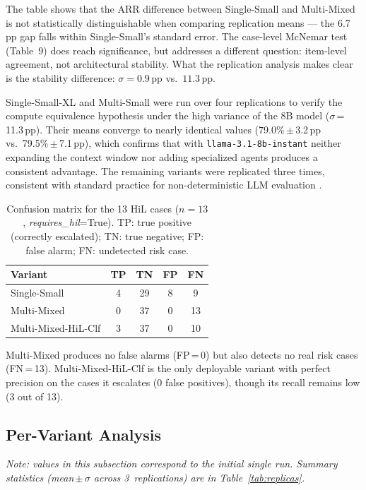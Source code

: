 \documentclass[preprint,12pt,numrefs]{elsarticle}
\begin{document}
The table shows that the ARR difference between Single-Small and
Multi-Mixed is not statistically distinguishable when comparing
replication means --- the 6.7\,pp gap falls within Single-Small's
standard error. The case-level McNemar test (Table~9) does reach
significance, but addresses a different question: item-level agreement,
not architectural stability. What the replication analysis makes clear
is the stability difference: $\sigma = 0.9$\,pp vs.\ $11.3$\,pp.

Single-Small-XL and Multi-Small were run over four replications
to verify the compute equivalence hypothesis under the high variance
of the 8B model ($\sigma$\,=\,11.3\,pp). Their means converge to
nearly identical values (79.0\%\,$\pm$\,3.2\,pp vs.\
79.5\%\,$\pm$\,7.1\,pp), which confirms that with
\texttt{llama-3.1-8b-instant} neither expanding the context window
nor adding specialized agents produces a consistent advantage. The
remaining variants were replicated three times, consistent with
standard practice for non-deterministic LLM evaluation
\citep{ouyang2023nondeterminism}.


\begin{table}[H]
\centering
\caption{Confusion matrix for the 13 HiL cases ($n=13$,
         \textit{requires\_hil}=True). TP: true positive (correctly
         escalated); TN: true negative; FP: false alarm; FN: undetected
         risk case.}
\label{tab:confusion_hil}
\begin{tabular}{lcccc}
\toprule
\textbf{Variant} & \textbf{TP} & \textbf{TN} & \textbf{FP} & \textbf{FN} \\
\midrule
Single-Small        & 4 & 29 & 8 & 9 \\
Multi-Mixed         & 0 & 37 & 0 & 13 \\
Multi-Mixed-HiL-Clf & 3 & 37 & 0 & 10 \\
\bottomrule
\end{tabular}
\end{table}

Multi-Mixed produces no false alarms (FP\,=\,0) but also detects no
real risk cases (FN\,=\,13). Multi-Mixed-HiL-Clf is the only
deployable variant with perfect precision on the cases it escalates
(0 false positives), though its recall remains low (3 out of 13).

\subsection{Per-Variant Analysis}

\emph{Note: values in this subsection correspond to the initial single
run. Summary statistics (mean\,$\pm$\,$\sigma$ across 3~replications)
are in Table~\ref{tab:replicas}.}
\end{document}
